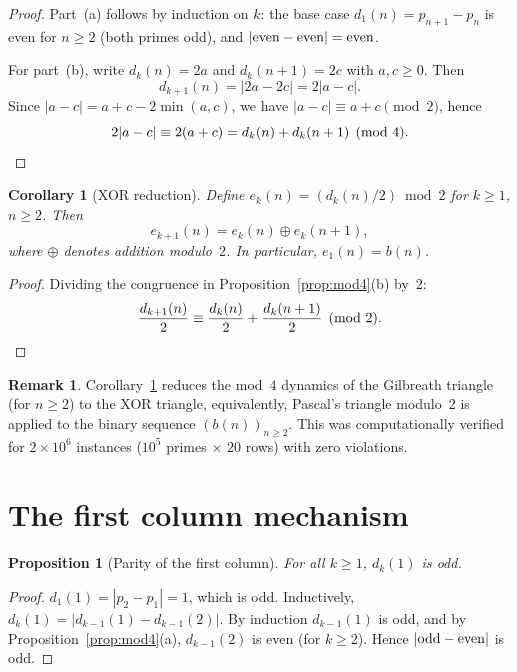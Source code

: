 \documentclass[11pt, a4paper]{amsart}
\theoremstyle{plain}
\newtheorem{proposition}[theorem]{Proposition}
\newtheorem{corollary}[theorem]{Corollary}
\theoremstyle{definition}
\newtheorem{remark}[theorem]{Remark}
\begin{document}
\begin{proof}
Part~(a) follows by induction on $k$: the base case $d_1(n) = p_{n+1} - p_n$ is even for $n \ge 2$ (both primes odd), 
and $|{\rm even} - {\rm even}| = {\rm even}$.

For part~(b), write $d_k(n) = 2a$ and $d_k(n+1) = 2c$ with $a, c \ge 0$. Then
\[
d_{k+1}(n) = |2a - 2c| = 2|a - c|.
\]
Since $|a - c| = a + c - 2\min(a,c)$, we have $|a-c| \equiv a + c \pmod{2}$, hence
\[
2|a-c| \equiv 2(a+c) = d_k(n) + d_k(n+1) \pmod{4}. \qedhere
\]
\end{proof}

\begin{corollary}[XOR reduction]\label{cor:xor}
Define $e_k(n) = (d_k(n)/2) \bmod 2$ for $k \ge 1$, $n \ge 2$. Then
\[
e_{k+1}(n) = e_k(n) \oplus e_k(n+1),
\]
where $\oplus$ denotes addition modulo~$2$. In particular, $e_1(n) = b(n)$.
\end{corollary}

\begin{proof}
Dividing the congruence in Proposition~\ref{prop:mod4}(b) by~$2$:
\[
\frac{d_{k+1}(n)}{2} \equiv \frac{d_k(n)}{2} + \frac{d_k(n+1)}{2} \pmod{2}. \qedhere
\]
\end{proof}

\begin{remark}
Corollary~\ref{cor:xor} reduces the mod~4 dynamics of the Gilbreath triangle (for $n \ge 2$) to the XOR triangle, equivalently, Pascal's triangle 
modulo~2 is applied to the binary sequence $(b(n))_{n \ge 2}$. This was computationally verified for $2 \times 10^6$ instances ($10^5$ primes $\times$ $20$ rows) with zero violations.
\end{remark}

\section{The first column mechanism}
\label{sec:first-column}

\begin{proposition}[Parity of the first column]\label{prop:odd}
For all $k \ge 1$, $d_k(1)$ is odd.
\end{proposition}

\begin{proof}
$d_1(1) = |p_2 - p_1| = 1$, which is odd. Inductively, $d_k(1) = |d_{k-1}(1) - d_{k-1}(2)|$. By induction $d_{k-1}(1)$ is odd, 
and by Proposition~\ref{prop:mod4}(a), $d_{k-1}(2)$ is even (for $k \ge 2$). Hence $|{\rm odd} - {\rm even}|$ is odd.
\end{proof}
\end{document}
